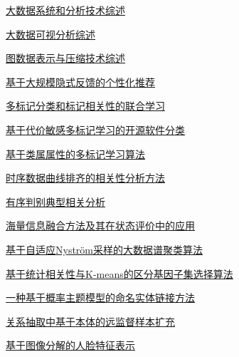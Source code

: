\documentclass[a4paper]{article}
\begin{document}
\href{http://www.jos.org.cn/ch/reader/download_pdf.aspx?file_no=4674&year_id=2014&quarter_id=9&falg=1}{大数据系统和分析技术综述}

\href{http://www.jos.org.cn/ch/reader/download_pdf.aspx?file_no=4645&year_id=2014&quarter_id=9&falg=1}{大数据可视分析综述}

\href{http://www.jos.org.cn/ch/reader/download_pdf.aspx?file_no=4636&year_id=2014&quarter_id=9&falg=1}{图数据表示与压缩技术综述}

\href{http://www.jos.org.cn/ch/reader/download_pdf.aspx?file_no=4648&year_id=2014&quarter_id=9&falg=1}{基于大规模隐式反馈的个性化推荐}

\href{http://www.jos.org.cn/ch/reader/download_pdf.aspx?file_no=4634&year_id=2014&quarter_id=9&falg=1}{多标记分类和标记相关性的联合学习}

\href{http://www.jos.org.cn/ch/reader/download_pdf.aspx?file_no=4639&year_id=2014&quarter_id=9&falg=1}{基于代价敏感多标记学习的开源软件分类}

\href{http://www.jos.org.cn/ch/reader/download_pdf.aspx?file_no=4641&year_id=2014&quarter_id=9&falg=1}{基于类属属性的多标记学习算法}

\href{http://www.jos.org.cn/ch/reader/download_pdf.aspx?file_no=4635&year_id=2014&quarter_id=9&falg=1}{时序数据曲线排齐的相关性分析方法}

\href{http://www.jos.org.cn/ch/reader/download_pdf.aspx?file_no=4649&year_id=2014&quarter_id=9&falg=1}{有序判别典型相关分析}

\href{http://www.jos.org.cn/ch/reader/download_pdf.aspx?file_no=4632&year_id=2014&quarter_id=9&falg=1}{海量信息融合方法及其在状态评价中的应用}

\href{http://www.jos.org.cn/ch/reader/download_pdf.aspx?file_no=4643&year_id=2014&quarter_id=9&falg=1}{基于自适应Nyström采样的大数据谱聚类算法}

\href{http://www.jos.org.cn/ch/reader/download_pdf.aspx?file_no=4644&year_id=2014&quarter_id=9&falg=1}{基于统计相关性与K-means的区分基因子集选择算法}

\href{http://www.jos.org.cn/ch/reader/download_pdf.aspx?file_no=4642&year_id=2014&quarter_id=9&falg=1}{一种基于概率主题模型的命名实体链接方法}

\href{http://www.jos.org.cn/ch/reader/download_pdf.aspx?file_no=4638&year_id=2014&quarter_id=9&falg=1}{关系抽取中基于本体的远监督样本扩充}

\href{http://www.jos.org.cn/ch/reader/download_pdf.aspx?file_no=4651&year_id=2014&quarter_id=9&falg=1}{基于图像分解的人脸特征表示}
\end{document}
